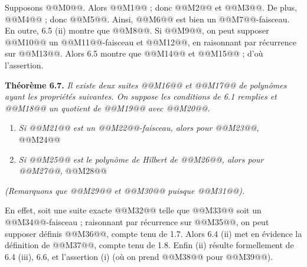 

Supposons @@M0@@. Alors @@M1@@ ; donc @@M2@@ et @@M3@@. De plus, @@M4@@ ; donc @@M5@@. Ainsi, @@M6@@ est bien un @@M7@@-faisceau. En outre, 6.5 (ii) montre que @@M8@@. Si @@M9@@, on peut supposer @@M10@@ un @@M11@@-faisceau et @@M12@@, en raisonnant par r\'ecurrence sur @@M13@@. Alors 6.5 montre que @@M14@@ et @@M15@@ ; d'o\`u l'assertion.

\textbf{Th\'eor\`eme 6.7.} \emph{Il existe deux suites @@M16@@ et @@M17@@ de polyn\^omes ayant les propri\'et\'es suivantes. On suppose les conditions de 6.1 remplies et @@M18@@ un quotient de @@M19@@ avec @@M20@@.}
\begin{enumerate}[label=(\roman*)]
\item \emph{Si @@M21@@ est un @@M22@@-faisceau, alors pour @@M23@@,}
@@M24@@
\item \emph{Si @@M25@@ est le polyn\^ome de Hilbert de @@M26@@, alors pour @@M27@@,}
@@M28@@
\end{enumerate}
\emph{(Remarquons que @@M29@@ et @@M30@@ puisque @@M31@@).}

En effet, soit une suite exacte @@M32@@ telle que @@M33@@ soit un @@M34@@-faisceau ; raisonnant par r\'ecurrence sur @@M35@@, on peut supposer d\'efinis @@M36@@, compte tenu de 1.7. Alors 6.4 (ii) met en \'evidence la d\'efinition de @@M37@@, compte tenu de 1.8. Enfin (ii) r\'esulte formellement de 6.4 (iii), 6.6, et l'assertion (i) (o\`u on prend @@M38@@ pour @@M39@@).

